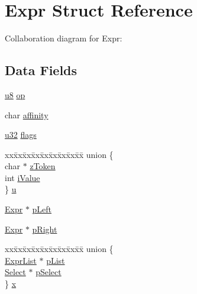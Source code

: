 \hypertarget{struct_expr}{}\section{Expr Struct Reference}
\label{struct_expr}


Collaboration diagram for Expr\+:
\subsection*{Data Fields}
\begin{DoxyCompactItemize}
\item 
\hyperlink{sqlite3_8c_a74a0f6424ae628af25f23f0a35f6ead3}{u8} \hyperlink{struct_expr_a0991b29aa40e12f033237266ebe6610c}{op}
\item 
char \hyperlink{struct_expr_a58ce1ac60212fdb49de8a3029209e9e2}{affinity}
\item 
\hyperlink{sqlite3_8c_a03ad5adfaeb9b7640dde78a0cc390319}{u32} \hyperlink{struct_expr_a9fb2abd9f2594cefc48d6856e01f2879}{flags}
\item 
\begin{tabbing}
xx\=xx\=xx\=xx\=xx\=xx\=xx\=xx\=xx\=\kill
union \{\\
\>char $\ast$ \hyperlink{struct_expr_a5a93ea536dadeb6f29a3542041ba5bf3}{zToken}\\
\>int \hyperlink{struct_expr_ac5de02e20d85842177a764866cef4ad2}{iValue}\\
\} \hyperlink{struct_expr_a513b253e2c7a4c81bbe4baa751ee3234}{u}\\

\end{tabbing}\item 
\hyperlink{struct_expr}{Expr} $\ast$ \hyperlink{struct_expr_a8494f5987915c2735faa11ebf6a2c878}{p\+Left}
\item 
\hyperlink{struct_expr}{Expr} $\ast$ \hyperlink{struct_expr_ad49d066af985113c5e9bc75df3810e84}{p\+Right}
\item 
\begin{tabbing}
xx\=xx\=xx\=xx\=xx\=xx\=xx\=xx\=xx\=\kill
union \{\\
\>\hyperlink{struct_expr_list}{ExprList} $\ast$ \hyperlink{struct_expr_a16a988c1a5b1865fd1162b12c59beea0}{pList}\\
\>\hyperlink{struct_select}{Select} $\ast$ \hyperlink{struct_expr_ab0e0ccc47de126415a7ad889ff1d228a}{pSelect}\\
\} \hyperlink{struct_expr_a95457a56ef1d34bb75d4a453d46857b6}{x}\\


\end{tabbing}
\end{DoxyCompactItemize}
